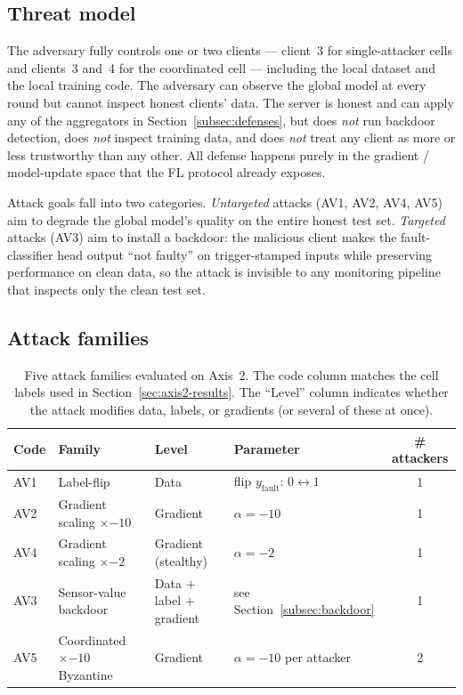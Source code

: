 \documentclass[preprint,12pt,authoryear]{elsarticle}
\begin{document}
\subsection{Threat model}
\label{subsec:threat-model}

The adversary fully controls one or two clients --- client~3 for
single-attacker cells and clients~3 and~4 for the coordinated cell
--- including the local dataset and the local training code. The
adversary can observe the global model at every round but cannot
inspect honest clients' data. The server is honest and can apply
any of the aggregators in Section~\ref{subsec:defenses}, but does
\emph{not} run backdoor detection, does \emph{not} inspect training
data, and does \emph{not} treat any client as more or less
trustworthy than any other. All defense happens purely in the
gradient / model-update space that the FL protocol already exposes.

Attack goals fall into two categories. \emph{Untargeted} attacks
(AV1, AV2, AV4, AV5) aim to degrade the global model's quality on
the entire honest test set. \emph{Targeted} attacks (AV3) aim to
install a backdoor: the malicious client makes the fault-classifier
head output ``not faulty'' on trigger-stamped inputs while
preserving performance on clean data, so the attack is invisible to
any monitoring pipeline that inspects only the clean test set.

\subsection{Attack families}
\label{subsec:attacks}

\begin{table}[!ht]
\centering
\footnotesize
\setlength{\tabcolsep}{6pt}
\renewcommand{\arraystretch}{1.15}
\caption{Five attack families evaluated on Axis~2. The code column
matches the cell labels used in Section~\ref{sec:axis2-results}.
The ``Level'' column indicates whether the attack modifies data,
labels, or gradients (or several of these at once).}
\label{tab:attacks}
\begin{tabular}{@{}l l l l c@{}}
\toprule
Code & Family & Level & Parameter & \# attackers \\
\midrule
AV1 & Label-flip                  & Data                        & flip $y_{\mathrm{fault}}$: $0 \leftrightarrow 1$ & 1 \\
AV2 & Gradient scaling $\times{-10}$ & Gradient                  & $\alpha = -10$                                   & 1 \\
AV4 & Gradient scaling $\times{-2}$  & Gradient (stealthy)        & $\alpha = -2$                                    & 1 \\
AV3 & Sensor-value backdoor       & Data $+$ label $+$ gradient & see Section~\ref{subsec:backdoor}                & 1 \\
AV5 & Coordinated $\times{-10}$ Byzantine & Gradient           & $\alpha = -10$ per attacker                      & 2 \\
\bottomrule
\end{tabular}
\end{table}
\end{document}

